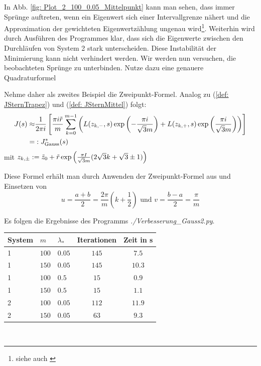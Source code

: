 \documentclass[a4paper,12pt]{report}
\newcommand{\zitat}[1]{\glqq #1\grqq}
\newcommand{\klammer}[1]{\left(#1\right)}
\newcommand{\1}{\mathds{1}}
\theoremstyle{plain} %
\theoremstyle{definition} %
\theoremstyle{remark}
\begin{document}
            In Abb. \ref{fig: Plot_2_100_0.05_Mittelpunkt} kann man sehen, dass immer Sprünge auftreten, wenn ein Eigenwert sich einer Intervallgrenze nähert und die Approximation der gewichteten Eigenwertzählung ungenau wird\footnote{siehe auch \cite[\textit{./Verbesserung\_Mittelpunkt.py}]{github}}.
            Weiterhin wird durch Ausführen des Programmes klar, dass sich die Eigenwerte zwischen den Durchläufen von System 2 stark unterscheiden.
            Diese Instabilität der Minimierung kann nicht verhindert werden.
            Wir werden nun versuchen, die beobachteten Sprünge zu unterbinden. Nutze dazu eine genauere Quadraturformel

            Nehme daher als zweites Beispiel die \zitat{Zweipunkt-Formel}\cite[S. 526]{numerikHermann}. Analog zu (\ref{def: JSternTrapez}) und (\ref{def: JSternMittel}) folgt:
            \begin{align}
                  J(s) \approx& \frac 1 {2\pi i}\left[\frac{\pi i \Tilde r}{m}\sum_{k=0}^{m-1}\klammer{L(z_{k,-}, s)\exp\klammer{-\frac{\pi i}{\sqrt{3}m}}+L(z_{k,+}, s)\exp\klammer{\frac{\pi i}{\sqrt{3}m}}}\right]\nonumber\\
                  =&: J^*_{\text{Gauss}}(s)
            \end{align}
            mit $z_{k,\pm}:=\Tilde z_0+\Tilde r\exp\klammer{\frac{\pi I}{\sqrt{3}m}(2\sqrt 3 k+\sqrt 3 \pm 1)}$

            Diese Formel erhält man durch Anwenden der Zweipunkt-Formel aus \cite[S. 526]{numerikHermann} und Einsetzen von
            $$u= \frac{a+b}{2} = \frac{2\pi}{m}(k+\frac 1 2)\text{ und }v=\frac{b-a}{2}=\frac \pi m$$

            Es folgen die Ergebnisse des Programms \textit{./Verbesserung\_Gauss2.py}.

            \begin{table}[!ht]
                  \centering
                  \begin{tabular}{lllcc}
                       System & $m$ & $\lambda_*$ & Iterationen & Zeit in s\\
                       \hline
                       1 & $100$ & $0.05$ & $145$ & $7.5$ \\ 
                       1 & $150$ & $0.05$ & $145$ & $10.3$ \\
                       \hline
                       1 & $100$ & $0.5$ & $15$ & $0.9$ \\
                       1 & $150$ & $0.5$ & $15$ & $1.1$ \\
                       \hline
                       2 & $100$ & $0.05$ & $112$ & $11.9$ \\
                       2 & $150$ & $0.05$ & $63$ & $9.3$ \\
                       \hline
                  \end{tabular}\\
                  \label{tab: Ergebnisse_Gauss2}
            \end{table}
\end{document}
